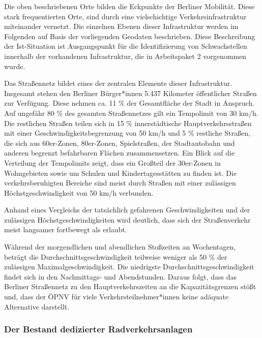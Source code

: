 Die oben beschriebenen Orte bilden die Eckpunkte der Berliner Mobilität. Diese stark frequentierten Orte, sind durch eine vielschichtige Verkehrsinfrastruktur miteinander vernetzt. Die einzelnen Ebenen dieser Infrastruktur werden im Folgenden auf Basis der vorliegenden Geodaten beschrieben. Diese Beschreibung der Ist-Situation ist Ausgangspunkt für die Identifizierung von Schwachstellen innerhalb der vorhandenen Infrastruktur, die in Arbeitspaket 2 vorgenommen wurde.

Das Straßennetz bildet eines der zentralen Elemente dieser Infrastruktur. Insgesamt stehen den Berliner Bürger*innen 5.437 Kilometer öffentlicher Straßen zur Verfügung. Diese nehmen ca. 11 \% der Gesamtfläche der Stadt in Anspruch. Auf ungefähr 80 \% des gesamten Straßennetzes gilt ein Tempolimit von 30 km/h. Die restlichen Straßen teilen sich in 15 \% innerstädtische Hauptverkehrsstraßen mit einer Geschwindigkeitsbegrenzung von 50 km/h und 5 \% restliche Straßen, die sich aus 60er-Zonen, 80er-Zonen, Spielstraßen, der Stadtautobahn und anderen begrenzt befahrbaren Flächen zusammensetzen. Ein Blick auf die Verteilung der Tempolimits zeigt, dass ein Großteil der 30er-Zonen in Wohngebieten sowie um Schulen und Kindertagesstätten zu finden ist. Die verkehrsberuhigten Bereiche sind meist durch Straßen mit einer zulässigen Höchstgeschwindigkeit von 50 km/h verbunden.


Anhand eines Vergleichs der tatsächlich gefahrenen Geschwindigkeiten und der zulässigen Höchstgeschwindigkeiten wird deutlich, dass sich der Straßenverkehr meist langsamer fortbewegt als erlaubt.


Während der morgendlichen und abendlichen Stoßzeiten an Wochentagen, beträgt die Durchschnittsgeschwindigkeit teilweise weniger als 50 \% der zulässigen Maximalgeschwindigkeit. Die niedrigste Durchschnittsgeschwindigkeit findet sich in den Nachmittags- und Abendstunden. Daraus folgt, dass das Berliner Straßennetz zu den Hauptverkehrszeiten an die Kapazitätsgrenzen stößt und, dass der ÖPNV für viele Verkehrsteilnehmer*innen keine adäquate Alternative darstellt.

\subsubsection{Der Bestand dedizierter Radverkehrsanlagen}

